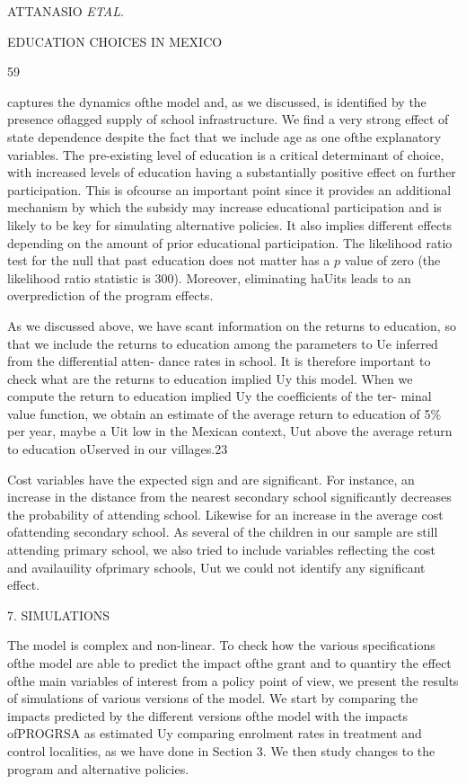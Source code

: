 ATTANASIO {\it ETAL}.

EDUCATION CHOICES IN MEXICO

59

captures the dynamics ofthe model and, as we discussed, is identified by the presence oflagged supply of school infrastructure. We find a very strong effect of state dependence despite the fact that we include age as one ofthe explanatory variables. The pre-existing level of education is a critical determinant of choice, with increased levels of education having a substantially positive effect on further participation. This is ofcourse an important point since it provides an additional mechanism by which the subsidy may increase educational participation and is likely to be key for simulating alternative policies. It also implies different effects depending on the amount of prior educational participation. The likelihood ratio test for the null that past education does not matter has a $p$ value of zero (the likelihood ratio statistic is 300). Moreover, eliminating haUits leads to an overprediction of the program effects.

As we discussed above, we have scant information on the returns to education, so that we include the returns to education among the parameters to Ue inferred from the differential atten- dance rates in school. It is therefore important to check what are the returns to education implied Uy this model. When we compute the return to education implied Uy the coefficients of the ter- minal value function, we obtain an estimate of the average return to education of 5\% per year, maybe a Uit low in the Mexican context, Uut above the average return to education oUserved in our villages.23

Cost variables have the expected sign and are significant. For instance, an increase in the distance from the nearest secondary school significantly decreases the probability of attending school. Likewise for an increase in the average cost ofattending secondary school. As several of the children in our sample are still attending primary school, we also tried to include variables reflecting the cost and availauility ofprimary schools, Uut we could not identify any significant effect.

7. SIMULATIONS

The model is complex and non-linear. To check how the various specifications ofthe model are able to predict the impact ofthe grant and to quantiry the effect ofthe main variables of interest from a policy point of view, we present the results of simulations of various versions of the model. We start by comparing the impacts predicted by the different versions ofthe model with the impacts ofPROGRSA as estimated Uy comparing enrolment rates in treatment and control localities, as we have done in Section 3. We then study changes to the program and alternative policies.

